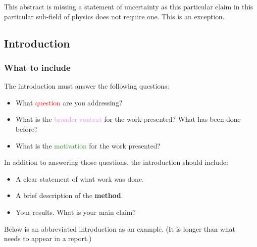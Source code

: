 \documentclass[12pt]{article}
\begin{document}
 This abstract is missing a statement of uncertainty as this particular claim in this
 particular sub-field of physics does not require one. This is an
 exception.

 \newpage

\subsection{Introduction}
\label{sec:Introduction}

\subsubsection{What to include}

The introduction must answer the following questions:

\begin{itemize}
\item What \textcolor{red}{question} are you addressing?
\item What is the \textcolor{violet}{broader context} for the work
  presented? What has been done before?
\item What is the \textcolor{ForestGreen}{motivation} for the work
  presented?
\end{itemize}

In addition to answering those questions, the introduction should
include:

\begin{itemize}
\item A clear \textcolor{BurntOrange}{statement of what work was done}.
\item A brief description of the {\bf method}.
\item Your results. What is your main \textcolor{Sepia}{claim}?
\end{itemize}

Below is an abbreviated introduction as an example. (It is longer than
what needs to appear in a report.)
\end{document}
